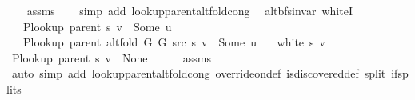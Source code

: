 \begin{isabellebody}
%
\endisadeliminvisible
%
\isadelimproof
\ \ %
\endisadelimproof
%
\isatagproof
{}\isamarkupfalse%
\ assms\isanewline
\ \ \isamarkupfalse%
\ {\isacharparenleft}{\kern0pt}simp\ add{\isacharcolon}{\kern0pt}\ lookup{\isacharunderscore}{\kern0pt}parent{\isacharunderscore}{\kern0pt}alt{\isacharunderscore}{\kern0pt}fold{\isacharunderscore}{\kern0pt}cong{\isacharparenright}{\kern0pt}%
\endisatagproof
{\isafoldproof}%
%
\isadelimproof
\isanewline
%
\endisadelimproof
%
\isadeliminvisible
\isanewline
%
\endisadeliminvisible
%
\isataginvisible
{}\isamarkupfalse%
\ {\isacharparenleft}{\kern0pt}\ alt{\isacharunderscore}{\kern0pt}bfs{\isacharunderscore}{\kern0pt}invar{\isacharparenright}{\kern0pt}\ whiteI{\isacharcolon}{\kern0pt}\isanewline
\ \ \ {\isachardoublequoteopen}P{\isacharunderscore}{\kern0pt}lookup\ {\isacharparenleft}{\kern0pt}parent\ s{\isacharparenright}{\kern0pt}\ v\ {\isasymnoteq}\ Some\ u{\isachardoublequoteclose}\isanewline
\ \ \ {\isachardoublequoteopen}P{\isacharunderscore}{\kern0pt}lookup\ {\isacharparenleft}{\kern0pt}parent\ {\isacharparenleft}{\kern0pt}alt{\isacharunderscore}{\kern0pt}fold\ G{}\ G{}\ src\ s{\isacharparenright}{\kern0pt}{\isacharparenright}{\kern0pt}\ v\ {\isacharequal}{\kern0pt}\ Some\ u{\isachardoublequoteclose}\isanewline
\ \ \ {\isachardoublequoteopen}white\ s\ v{\isachardoublequoteclose}%
\endisataginvisible
{\isafoldinvisible}%
%
\isadeliminvisible
\isanewline
%
\endisadeliminvisible
%
\isadelimproof
%
\endisadelimproof
%
\isatagproof
{}\isamarkupfalse%
\ {\isacharminus}{\kern0pt}\isanewline
\ \ \isamarkupfalse%
\ {\isachardoublequoteopen}P{\isacharunderscore}{\kern0pt}lookup\ {\isacharparenleft}{\kern0pt}parent\ s{\isacharparenright}{\kern0pt}\ v\ {\isacharequal}{\kern0pt}\ None{\isachardoublequoteclose}\isanewline
\ \ \ \ \isamarkupfalse%
\ assms\isanewline
\ \ \ \ \isamarkupfalse%
\ {\isacharparenleft}{\kern0pt}auto\ simp\ add{\isacharcolon}{\kern0pt}\ lookup{\isacharunderscore}{\kern0pt}parent{\isacharunderscore}{\kern0pt}alt{\isacharunderscore}{\kern0pt}fold{\isacharunderscore}{\kern0pt}cong\ override{\isacharunderscore}{\kern0pt}on{\isacharunderscore}{\kern0pt}def\ is{\isacharunderscore}{\kern0pt}discovered{\isacharunderscore}{\kern0pt}def\ split{\isacharcolon}{\kern0pt}\ if{\isacharunderscore}{\kern0pt}splits{\isacharparenleft}{\kern0pt}{}{\isacharparenright}{\kern0pt}{\isacharparenright}{\kern0pt}\isanewline

\end{isabellebody}
